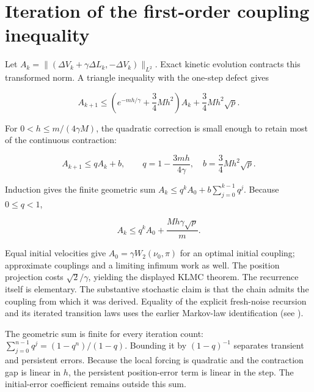 \documentclass[11pt,a4paper]{article}
\begin{document}
\section{\texorpdfstring{Iteration of the first-order coupling inequality}{Iteration of the first-order coupling inequality}}


Let
\(A_k=\| (\Delta V_k+\gamma\Delta L_k,-\Delta V_k)\|_{L^2}\).
Exact kinetic evolution contracts this transformed norm. A triangle inequality
with the one-step defect gives


\[A_{k+1}\le\left(e^{-mh/\gamma}+\frac34Mh^2\right)A_k
+\frac34Mh^2\sqrt p.\]


For \(0<h\le m/(4\gamma M)\), the quadratic correction is small enough
to retain most of the continuous contraction:


\[A_{k+1}\le qA_k+b,\qquad
q=1-\frac{3mh}{4\gamma},\quad b=\frac34Mh^2\sqrt p.\]


Induction gives the finite geometric sum
\(A_k\le q^kA_0+b\sum_{j=0}^{k-1}q^j\). Because \(0\le q<1\),


\[A_k\le q^kA_0+\frac{Mh\gamma\sqrt p}m.\]


Equal initial velocities give \(A_0=\gamma W_2(\nu_0,\pi)\) for an
optimal initial coupling; approximate couplings and a limiting infimum work as
well. The position projection costs \(\sqrt2/\gamma\), yielding the displayed
KLMC theorem. The recurrence itself is elementary. The substantive stochastic
claim is that the chain admits the coupling from which it was derived. Equality of the explicit fresh-noise recursion and its iterated transition laws uses the earlier Markov-law identification (see \cite[Section~3.33.12]{LangevinLean2026ULASC}).



The geometric sum is finite for every iteration count: \(\sum_{j=0}^{n-1}q^j=(1-q^n)/(1-q)\). Bounding it by \((1-q)^{-1}\) separates transient and persistent errors. Because the local forcing is quadratic and the contraction gap is linear in \(h\), the persistent position-error term is linear in the step. The initial-error coefficient remains outside this sum.
\end{document}
